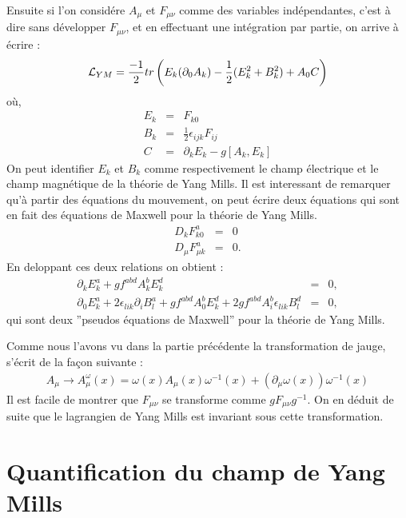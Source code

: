 \documentclass[a4paper,11pt]{article} %
\theoremstyle{plain}
\theoremstyle{definition}
\theoremstyle{remark}
\numberwithin{equation}{section}
\numberwithin{equation}{subsection}
\numberwithin{figure}{section}
\begin{document}
Ensuite si l'on considére $A_{\mu}$ et $F_{\mu \nu}$ comme des variables indépendantes, c'est à dire sans développer $F_{\mu \nu}$, et en effectuant une intégration par partie, on arrive à écrire :
\begin{eqnarray*}
\mathcal{L}_{\small YM} = \frac{-1}{2} tr\left( E_{k}(\partial_{0} A_{k}) - \frac{1}{2}(E_{k}^{2} + B_{k}^2) + A_{0}C\right)
\end{eqnarray*}
où,
\begin{eqnarray*}
 E_k &=& F_{k0}\\
 B_k &=& \frac{1}{2} \epsilon_{ijk} F_{ij}\\
 C &=& \partial_{k} E_{k} - g[A_k , E_k] 
\end{eqnarray*}
On peut identifier $E_k$ et $B_k$ comme respectivement le champ électrique et le champ magnétique de la théorie de Yang Mills. Il est interessant de remarquer qu'à partir des équations du mouvement, on peut écrire deux équations qui sont en fait des équations de Maxwell pour la théorie de Yang Mills.
\begin{eqnarray*}
 D_{k}  F^{a}_{k0}  &=& 0   \\
 D_{\mu} F^{a}_{\mu k} &=& 0.
\end{eqnarray*}
En deloppant ces deux relations on obtient : 
\begin{eqnarray*}
 \partial_{k} E^{a}_{k}  + g f^{abd} A^{b}_{k} E^{d}_{k}  &=& 0,  \\
 \partial_{0} E^{a}_{k} + 2 \epsilon_{lik} \partial_{i} B^{a}_{l} + g f^{abd} A^{b}_{0} E^{d}_{k } 
+ 2 g  f^{abd} A^{b}_{i} \epsilon_{lik} B^{d}_{l } &=& 0,
\end{eqnarray*}
qui sont deux ''pseudos équations de Maxwell'' pour la théorie de Yang Mills.
 
\noindent
Comme nous l'avons vu dans la partie précédente la transformation de jauge, s'écrit de la façon suivante :
\begin{eqnarray*}
 A_{\mu} \rightarrow  A^{\omega}_{\mu}(x)=\omega(x)A_{\mu}(x)\omega^{-1}(x) + ( \partial_{\mu} \omega(x) ) \omega^{-1}(x)
\end{eqnarray*}
Il est facile de montrer que $F_{\mu \nu}$ se transforme comme $g F_{\mu \nu} g^{-1}$. On en déduit de suite que le lagrangien de Yang Mills est invariant sous cette transformation.

\section{Quantification du champ de Yang Mills}
\end{document}
